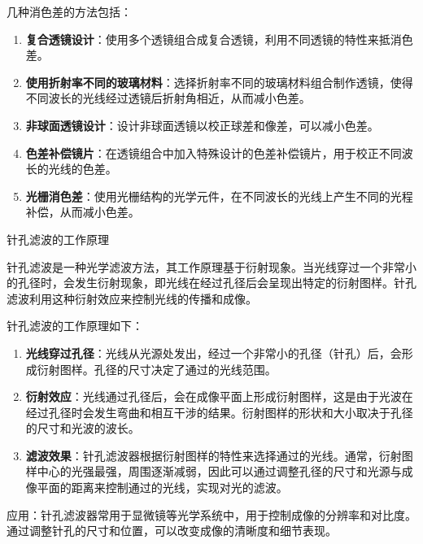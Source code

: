 \documentclass[dvipsnames, svgnames,a4paper,11pt]{article}
\begin{document}
	几种消色差的方法包括：
	
	\begin{enumerate}
		\item \textbf{复合透镜设计}：使用多个透镜组合成复合透镜，利用不同透镜的特性来抵消色差。
		\item \textbf{使用折射率不同的玻璃材料}：选择折射率不同的玻璃材料组合制作透镜，使得不同波长的光线经过透镜后折射角相近，从而减小色差。
		\item \textbf{非球面透镜设计}：设计非球面透镜以校正球差和像差，可以减小色差。
		\item \textbf{色差补偿镜片}：在透镜组合中加入特殊设计的色差补偿镜片，用于校正不同波长的光线的色差。
		\item \textbf{光栅消色差}：使用光栅结构的光学元件，在不同波长的光线上产生不同的光程补偿，从而减小色差。
	\end{enumerate}

	
	
	
	


	\begin{question}
		针孔滤波的工作原理
	\end{question}

	针孔滤波是一种光学滤波方法，其工作原理基于衍射现象。当光线穿过一个非常小的孔径时，会发生衍射现象，即光线在经过孔径后会呈现出特定的衍射图样。针孔滤波利用这种衍射效应来控制光线的传播和成像。

	针孔滤波的工作原理如下：
	
	\begin{enumerate}
		\item \textbf{光线穿过孔径}：光线从光源处发出，经过一个非常小的孔径（针孔）后，会形成衍射图样。孔径的尺寸决定了通过的光线范围。
		
		\item \textbf{衍射效应}：光线通过孔径后，会在成像平面上形成衍射图样，这是由于光波在经过孔径时会发生弯曲和相互干涉的结果。衍射图样的形状和大小取决于孔径的尺寸和光波的波长。
		
		\item \textbf{滤波效果}：针孔滤波器根据衍射图样的特性来选择通过的光线。通常，衍射图样中心的光强最强，周围逐渐减弱，因此可以通过调整孔径的尺寸和光源与成像平面的距离来控制通过的光线，实现对光的滤波。
		
		
	\end{enumerate}

	应用：针孔滤波器常用于显微镜等光学系统中，用于控制成像的分辨率和对比度。通过调整针孔的尺寸和位置，可以改变成像的清晰度和细节表现。
\end{document}
